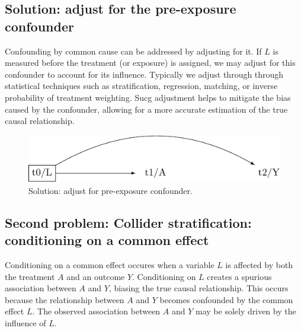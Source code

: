 \documentclass[
  singlecolumn]{report}
\begin{document}
\hypertarget{solution-adjust-for-the-pre-exposure-confounder}{%
\subsection{Solution: adjust for the pre-exposure
confounder}\label{solution-adjust-for-the-pre-exposure-confounder}}

Confounding by common cause can be addressed by adjusting for it. If
\(L\) is measured before the treatment (or exposure) is assigned, we may
adjust for this confounder to account for its influence. Typically we
adjust through through statistical techniques such as stratification,
regression, matching, or inverse probability of treatment weighting.
Sucg adjustment helps to mitigate the bias caused by the confounder,
allowing for a more accurate estimation of the true causal relationship.

\begin{figure}

{\centering \includegraphics[width=1\textwidth,height=\textheight]{causal-dags_files/figure-pdf/fig-dag-common-cause-solution-1.pdf}

}

\caption{\label{fig-dag-common-cause-solution}Solution: adjust for
pre-exposure confounder.}

\end{figure}

\hypertarget{second-problem-collider-stratification-conditioning-on-a-common-effect}{%
\subsection{Second problem: Collider stratification: conditioning on a
common
effect}\label{second-problem-collider-stratification-conditioning-on-a-common-effect}}

Conditioning on a common effect occures when a variable \(L\) is
affected by both the treatment \(A\) and an outcome \(Y\). Conditioning
on \(L\) creates a spurious association between \(A\) and \(Y\), biasing
the true causal relationship. This occurs because the relationship
between \(A\) and \(Y\) becomes confounded by the common effect \(L\).
The observed association between \(A\) and \(Y\) may be solely driven by
the influence of \(L\).
\end{document}
